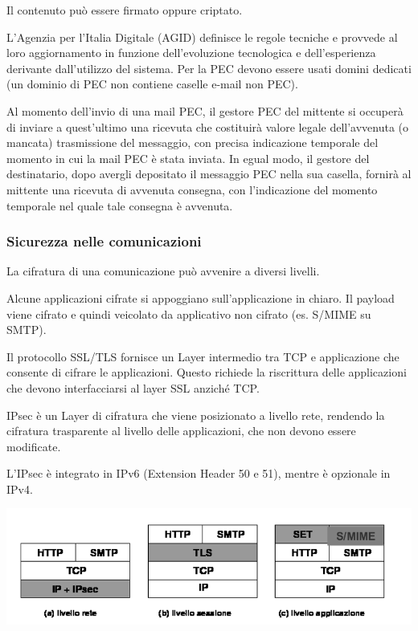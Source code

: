             Il contenuto può essere firmato oppure criptato.
        
            L'Agenzia per l'Italia Digitale (AGID) definisce le regole tecniche e provvede al loro aggiornamento in funzione dell'evoluzione tecnologica e dell'esperienza derivante dall'utilizzo del sistema. Per la PEC devono essere usati domini dedicati (un dominio di PEC non contiene caselle e-mail non PEC).
        
            Al momento dell'invio di una mail PEC, il gestore PEC del mittente si occuperà di inviare a quest'ultimo una ricevuta che costituirà valore legale dell'avvenuta (o mancata) trasmissione del messaggio, con precisa indicazione temporale del momento in cui la mail PEC è stata inviata. In egual modo, il gestore del destinatario, dopo avergli depositato il messaggio PEC nella sua casella, fornirà al mittente una ricevuta di avvenuta consegna, con l'indicazione del momento temporale nel quale tale consegna è avvenuta.

        \subsubsection{Sicurezza nelle comunicazioni}
            La cifratura di una comunicazione può avvenire a diversi livelli.
        
            Alcune applicazioni cifrate si appoggiano sull'applicazione in chiaro. Il payload viene cifrato e quindi veicolato da applicativo non cifrato (es. S/MIME su SMTP).
        
            Il protocollo SSL/TLS fornisce un Layer intermedio tra TCP e applicazione che consente di cifrare le applicazioni. Questo richiede la riscrittura delle applicazioni che devono interfacciarsi al layer SSL anziché TCP.
        
            IPsec è un Layer di cifratura che viene posizionato a livello rete, rendendo la cifratura trasparente al livello delle applicazioni, che non devono essere modificate.
            
            L'IPsec è integrato in IPv6 (Extension Header 50 e 51), mentre è opzionale in IPv4.

            \begin{center}
                \includegraphics[scale=0.4]{chapters/7/assets/schema_zy.png}
            \end{center}

